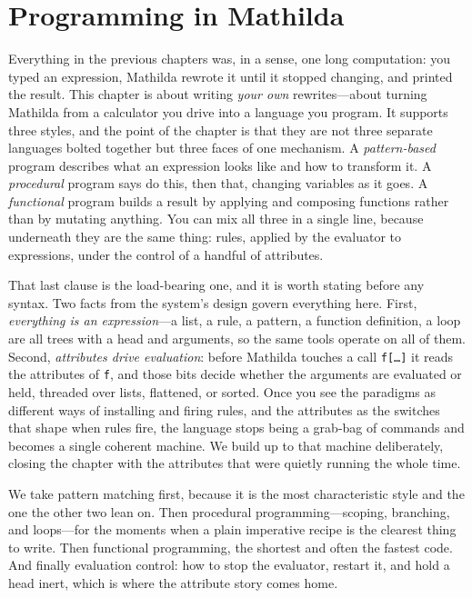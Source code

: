 \chapter{Programming in Mathilda}
\label{ch:programming}

Everything in the previous chapters was, in a sense, one long computation: you
typed an expression, Mathilda rewrote it until it stopped changing, and printed
the result. This chapter is about writing \emph{your own} rewrites---about
turning Mathilda from a calculator you drive into a language you program. It
supports three styles, and the point of the chapter is that they are not three
separate languages bolted together but three faces of one mechanism. A
\emph{pattern-based} program describes what an expression looks like and how to
transform it. A \emph{procedural} program says do this, then that, changing
variables as it goes. A \emph{functional} program builds a result by applying
and composing functions rather than by mutating anything. You can mix all three
in a single line, because underneath they are the same thing: rules, applied by
the evaluator to expressions, under the control of a handful of
attributes.

That last clause is the load-bearing one, and it is worth stating before any
syntax. Two facts from the system's design govern everything here. First,
\emph{everything is an expression}---a list, a rule,
a pattern, a function definition, a loop are all trees with a head and
arguments, so the same tools operate on all of them. Second, \emph{attributes
drive evaluation}: before Mathilda touches a call \texttt{f[\ldots]}
it reads the attributes of \texttt{f}, and those bits decide whether the
arguments are evaluated or held, threaded over lists, flattened, or sorted. Once
you see the paradigms as different ways of installing and firing rules, and the
attributes as the switches that shape when rules fire, the language stops being a
grab-bag of commands and becomes a single coherent machine. We build up to that
machine deliberately, closing the chapter with the attributes that were quietly
running the whole time.

We take pattern matching first, because it is the most characteristic style and
the one the other two lean on. Then procedural programming---scoping, branching,
and loops---for the moments when a plain imperative recipe is the clearest thing
to write. Then functional programming, the shortest and often the fastest code.
And finally evaluation control: how to stop the evaluator, restart it, and hold a
head inert, which is where the attribute story comes home.

